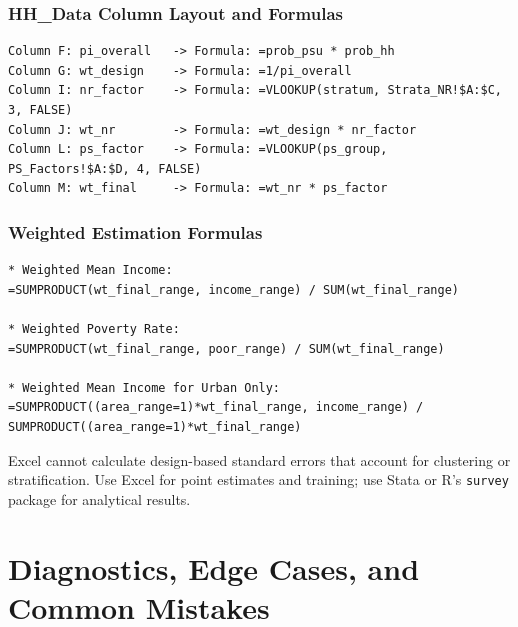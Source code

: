 \documentclass[11pt,a4paper]{article}
\begin{document}
\subsubsection{HH\_Data Column Layout and Formulas}
\begin{lstlisting}[style=excel, caption={Excel Formulas in HH\_Data Sheet}]
Column F: pi_overall   -> Formula: =prob_psu * prob_hh
Column G: wt_design    -> Formula: =1/pi_overall
Column I: nr_factor    -> Formula: =VLOOKUP(stratum, Strata_NR!$A:$C, 3, FALSE)
Column J: wt_nr        -> Formula: =wt_design * nr_factor
Column L: ps_factor    -> Formula: =VLOOKUP(ps_group, PS_Factors!$A:$D, 4, FALSE)
Column M: wt_final     -> Formula: =wt_nr * ps_factor
\end{lstlisting}

\subsubsection{Weighted Estimation Formulas}
\begin{lstlisting}[style=excel, caption={Weighted Estimation in Excel}]
* Weighted Mean Income:
=SUMPRODUCT(wt_final_range, income_range) / SUM(wt_final_range)

* Weighted Poverty Rate:
=SUMPRODUCT(wt_final_range, poor_range) / SUM(wt_final_range)

* Weighted Mean Income for Urban Only:
=SUMPRODUCT((area_range=1)*wt_final_range, income_range) / SUMPRODUCT((area_range=1)*wt_final_range)
\end{lstlisting}

\begin{diagnosticbox}
Excel cannot calculate design-based standard errors that account for clustering or stratification. Use Excel for point estimates and training; use Stata or R's \texttt{survey} package for analytical results.
\end{diagnosticbox}

\newpage

\section{Diagnostics, Edge Cases, and Common Mistakes}
\end{document}
